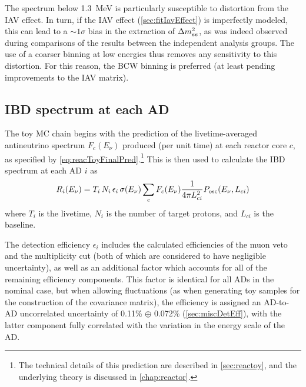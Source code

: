 \documentclass[../thesis.tex]{subfiles}
\begin{document}
The spectrum below 1.3~MeV is particularly susceptible to distortion from the IAV effect. In turn, if the IAV effect (\autoref{sec:fitIavEffect}) is imperfectly modeled, this can lead to a $\sim1\sigma$ bias in the extraction of $\Delta m^2_{ee}$, as was indeed observed during comparisons of the results between the independent analysis groups. The use of a coarser binning at low energies thus removes any sensitivity to this distortion. For this reason, the BCW binning is preferred (at least pending improvements to the IAV matrix).

\subsection{IBD spectrum at each AD}
\label{sec:fitToyFluxPred}

The toy MC chain begins with the prediction of the livetime-averaged antineutrino spectrum $F_c(E_\nu)$ produced (per unit time) at each reactor core $c$, as specified by \autoref{eq:reacToyFinalPred}.\footnote{The technical details of this prediction are described in \autoref{sec:reactoy}, and the underlying theory is discussed in \autoref{chap:reactor}.} This is then used to calculate the IBD spectrum at each AD $i$ as
\begin{equation}
  \label{eq:fitTrueIbdSpec}
  R_i(E_\nu) = T_i\,N_i\,\epsilon_i\,\sigma(E_\nu) \sum_c F_c(E_\nu) \frac{1}{4\pi L_{ci}^2}
  P_\mathrm{osc}(E_\nu, L_{ci})
\end{equation}
where $T_i$ is the livetime, $N_i$ is the number of target protons, and $L_{ci}$ is the baseline.

The detection efficiency $\epsilon_i$ includes the calculated efficiencies of the muon veto and the multiplicity cut (both of which are considered to have negligible uncertainty), as well as an additional factor which accounts for all of the remaining efficiency components. This factor is identical for all ADs in the nominal case, but when allowing fluctuations (as when generating toy samples for the construction of the covariance matrix), the efficiency is assigned an AD-to-AD uncorrelated uncertainty of 0.11\% $\oplus$ 0.072\% (\autoref{sec:miscDetEff}), with the latter component fully correlated with the variation in the energy scale of the AD.
\end{document}
